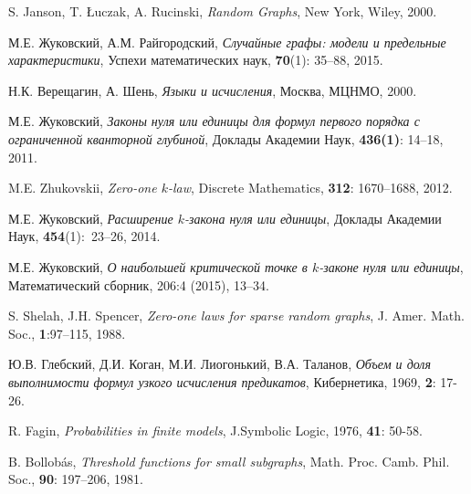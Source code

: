 \documentclass[12pt,a4paper,russian,titlepage]{article}
\begin{document}
\begin{thebibliography}{99}
 S. Janson, T. \L uczak, A. Rucinski, \emph{Random Graphs},
New York, Wiley, 2000.

 М.Е. Жуковский, А.М. Райгородский, \emph{Случайные графы: модели и предельные характеристики}, Успехи математических наук,  \textbf{70}(1): 35--88, 2015.

 Н.К. Верещагин, А. Шень, \emph{Языки и исчисления}, Москва,
МЦНМО, 2000.

 М.Е. Жуковский, \emph{Законы нуля или единицы для формул первого порядка с ограниченной кванторной глубиной}, Доклады Академии Наук, \textbf{436(1)}: 14--18, 2011.

 M.E. Zhukovskii, \emph{Zero-one $k$-law}, Discrete Mathematics, {\bf 312}: 1670--1688, 2012.

 М.Е. Жуковский, {\it Расширение $k$-закона нуля или единицы}, Доклады Академии Наук, {\bf 454}(1):~23--26, 2014.

 М.Е. Жуковский, {\it О наибольшей критической точке в $k$-законе нуля или единицы}, Математический сборник, 206:4 (2015), 13--34.


 S. Shelah, J.H. Spencer, \emph{Zero-one laws for sparse random graphs}, J. Amer. Math. Soc., \textbf{1}:97--115, 1988.



 Ю.В. Глебский, Д.И. Коган, М.И. Лиогонький, В.А. Таланов, \textit{Объем и доля выполнимости формул узкого исчисления предикатов}, Кибернетика, 1969, \textbf{2}: 17-26.

 R. Fagin, \textit{Probabilities in finite models}, J.Symbolic Logic, 1976, \textbf{41}: 50-58.


 B. Bollob\'{a}s, \emph{Threshold functions for small subgraphs}, Math. Proc. Camb. Phil. Soc., \textbf{90}: 197--206, 1981.

\end{thebibliography}
\end{document}

